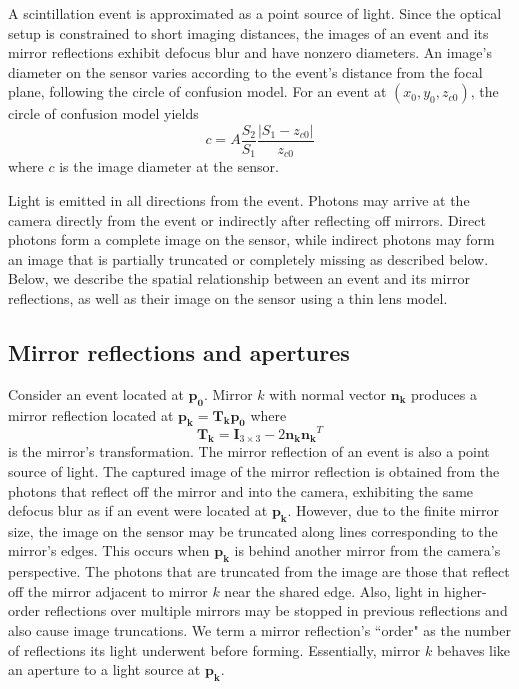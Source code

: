
A scintillation event is approximated as a point source of light.
Since the optical setup is constrained to short imaging distances, 
the images of an event and its mirror reflections exhibit defocus blur and 
have nonzero diameters.
An image's diameter on the sensor varies according to the event's distance from 
the focal plane, following the circle of confusion model.
For an event at $(x_0,y_0,z_{c0})$, 
the circle of confusion model yields
\begin{equation} \label{eqn:circ_of_conf}
c=A\frac{S_2}{S_1}\frac{|S_1-z_{c0}|}{z_{c0}}
\end{equation}
where $c$ is the image diameter at the sensor.

Light is emitted in all directions from the event.
Photons may arrive at the camera directly from the event or indirectly after 
reflecting off mirrors.
Direct photons form a complete image on the sensor, while indirect photons may 
form an image that is partially truncated or completely missing as described below.
Below, we describe the spatial relationship between an event and its mirror 
reflections, as well as their image on the sensor using a thin lens model.

\subsection{Mirror reflections and apertures}

Consider an event located at $\bm{p_0}$.
Mirror $k$ with normal vector $\bm{n_k}$ produces a mirror reflection located at 
$\bm{p_k}=\bm{T_k}\bm{p_0}$
where
\begin{equation} \label{eqn:ref_trans}
\bm{T_k}=\bm{I}_{3\times3} - 2\bm{n_k}\bm{n_k}^T
\end{equation}
is the mirror's transformation.
The mirror reflection of an event is also a point source of light.
The captured image of the mirror reflection is obtained from the photons that 
reflect off the mirror and into the camera, exhibiting the same defocus blur as if 
an event were located at $\bm{p_k}$.
However, due to the finite mirror size, the image on the sensor may be truncated 
along lines corresponding to the mirror's edges.
This occurs when $\bm{p_k}$ is behind another mirror from the camera's perspective.
The photons that are truncated from the image are those that reflect off the 
mirror adjacent to mirror $k$ near the shared edge.
Also, light in higher-order reflections over multiple mirrors may be stopped 
in previous reflections and also cause image truncations.
We term a mirror reflection's ``order" as the number of reflections its light 
underwent before forming.
Essentially, mirror $k$ behaves like an aperture to a light source at $\bm{p_k}$. 


